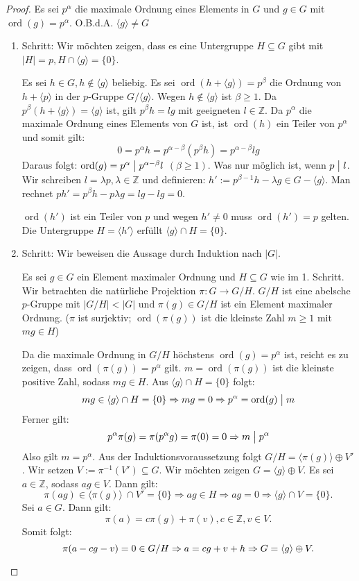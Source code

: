 \documentclass[12pt]{scrartcl} %
\DeclareMathOperator{\ord}{ord}
\newcommand{\divides}{\mathrel{\bigm|}}
\theoremstyle{definition}
\theoremstyle{remark}
\begin{document}
\begin{proof}
Es sei $p^{\alpha}$ die maximale Ordnung eines Elements in $G$ und $g\in G$ mit $\ord(g)=p^{\alpha}$. O.B.d.A. $\langle g\rangle \neq G$ 
\begin{enumerate}
\item Schritt: Wir möchten zeigen, dass es eine Untergruppe $H\subseteq G$ gibt mit $|H|=p, H\cap \langle g\rangle =\{ 0\}$.

Es sei $h \in G,h\notin \langle g \rangle$ beliebig.
Es sei $\ord(h+\langle g\rangle)=p^{\beta}$ die Ordnung von $h+\langle p\rangle$ in der $p$-Gruppe $G/\langle g\rangle$.
Wegen $h\notin \langle g\rangle$ ist $\beta\geq1$. 
Da $p^{\beta}(h+\langle g\rangle)=\langle g\rangle$ ist, gilt $p^{\beta}h=lg$ mit geeigneten $l\in \mathbb{Z}$. 
Da $p^{\alpha}$ die maximale Ordnung eines Elements von $G$ ist, ist $\ord(h)$ ein Teiler von $p^{\alpha}$ und somit gilt:
\[ 0=p^{\alpha}h=p^{\alpha -\beta}(p^{\beta}h)=p^{\alpha -\beta}lg\]
Daraus folgt: $ \ord(g)=p^{\alpha} \divides p^{\alpha -\beta}l$ $(\beta \geq 1)$. 
Was nur möglich ist, wenn $p \divides l$. 
Wir schreiben $l=\lambda p, \lambda \in \mathbb{Z}$ und definieren: $h':=p^{\beta -1}h-\lambda g \in G - \langle g \rangle.$ Man rechnet $ ph' = p^{\beta}h - p \lambda g =lg-lg=0$.

$\ord(h')$ ist ein Teiler von $p$ und wegen $h'\neq 0$ muss $\ord(h')=p$ gelten. 
Die Untergruppe $H=\langle h'\rangle$ erfüllt $\langle g\rangle \cap H=\{ 0\}$.
\item Schritt: Wir beweisen die Aussage durch Induktion nach $|G|$.

Es sei $g\in G$ ein Element maximaler Ordnung und $H\subseteq G$ wie im 1. Schritt. 
Wir betrachten die natürliche Projektion $\pi :G\rightarrow G/H$. 
$G/H$ ist eine abelsche $p$-Gruppe mit $|G/H|<|G|$ und $\pi (g)\in G/H$ ist ein Element maximaler Ordnung.
($\pi$ ist surjektiv; $\ord(\pi (g))$ ist die kleinste Zahl $m\geq 1$ mit $mg\in H$)

Da die maximale Ordnung in $G/H$ höchstens $\ord(g)=p^{\alpha}$ ist, reicht es zu zeigen, dass $\ord(\pi (g))=p^{\alpha}$ gilt.
$m=\ord(\pi (g))$ ist die kleinste positive Zahl, sodass $mg\in H$. Aus $\langle g\rangle \cap H=\{ 0\}$ folgt:
\[ mg\in \langle g\rangle \cap H=\{ 0\} \Rightarrow mg=0 \Rightarrow p^{\alpha}=\ord(g) \divides m\]
Ferner gilt:
\[ p^{\alpha}\pi (g)=\pi (p^{\alpha}g)=\pi(0) =0\Rightarrow m \divides p^{\alpha}\]
Also gilt $m=p^{\alpha}$. Aus der Induktionsvoraussetzung folgt $G/H=\langle \pi (g)\rangle \oplus V'$. 
Wir setzen $V := \pi ^{-1}(V') \subseteq G$. Wir möchten zeigen $G=\langle g\rangle \oplus V$. Es sei $a\in \mathbb{Z}$, sodass $ag\in V$. Dann gilt:
\[ \pi (ag)\in \langle \pi (g)\rangle\ \cap V'=\{ 0\}\Rightarrow ag\in H\Rightarrow ag=0\Rightarrow \langle g\rangle \cap V=\{ 0\}.\]
Sei $a\in G$. Dann gilt:
\[ \pi (a)=c\pi (g)+\pi (v),c\in \mathbb{Z}, v\in V.\]
Somit folgt:
\[ \pi (a-cg-v )=0\in G/H\Rightarrow a=cg+v+h\Rightarrow G = \langle g\rangle \oplus V.\qedhere \]
\end{enumerate} 
\end{proof}
\end{document}
